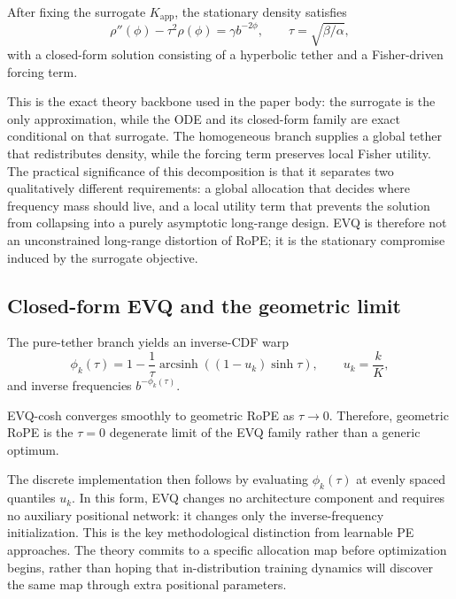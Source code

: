 \begin{theorem}
After fixing the surrogate \(K_{\mathrm{app}}\), the stationary density satisfies
\begin{equation}
\rho''(\phi) - \tau^2 \rho(\phi) = \gamma b^{-2\phi},
\qquad
\tau = \sqrt{\beta/\alpha},
\end{equation}
with a closed-form solution consisting of a hyperbolic tether and a Fisher-driven forcing term.
\end{theorem}

This is the exact theory backbone used in the paper body: the surrogate is the only approximation, while the ODE and its closed-form family are exact conditional on that surrogate. The homogeneous branch supplies a global tether that redistributes density, while the forcing term preserves local Fisher utility.
The practical significance of this decomposition is that it separates two qualitatively different requirements: a global allocation that decides where frequency mass should live, and a local utility term that prevents the solution from collapsing into a purely asymptotic long-range design. EVQ is therefore not an unconstrained long-range distortion of RoPE; it is the stationary compromise induced by the surrogate objective.

\subsection{Closed-form EVQ and the geometric limit}

The pure-tether branch yields an inverse-CDF warp
\begin{equation}
\phi_k(\tau)
=
1 - \frac{1}{\tau}
\operatorname{arcsinh}\!\left((1-u_k)\sinh\tau\right),
\qquad
u_k = \frac{k}{K},
\end{equation}
and inverse frequencies \(b^{-\phi_k(\tau)}\).

\begin{theorem}
EVQ-cosh converges smoothly to geometric RoPE as \(\tau \to 0\). Therefore, geometric RoPE is the \(\tau=0\) degenerate limit of the EVQ family rather than a generic optimum.
\end{theorem}

The discrete implementation then follows by evaluating \(\phi_k(\tau)\) at evenly spaced quantiles \(u_k\). In this form, EVQ changes no architecture component and requires no auxiliary positional network: it changes only the inverse-frequency initialization. This is the key methodological distinction from learnable PE approaches. The theory commits to a specific allocation map before optimization begins, rather than hoping that in-distribution training dynamics will discover the same map through extra positional parameters.

